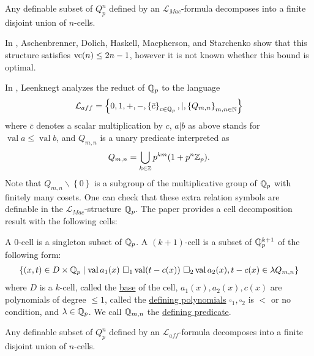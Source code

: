 \documentclass{amsart}
\renewcommand{\LL}{\mathcal L}
\newcommand{\LLM}{\mathcal L_{Mac}}
\newcommand{\curly}[1]{\left\{#1\right\}}
\DeclareMathOperator{\vval}{val}
\newcommand{\defn}{\underline}
\begin{document}
\begin{Theorem} [Denef '84]
  Any definable subset of $Q_p^n$ defined by an $\LLM$-formula decomposes into a finite disjoint union of $n$-cells.
\end{Theorem}  

In \cite{density}, Aschenbrenner, Dolich, Haskell, Macpherson, and Starchenko show that this structure satisfies $\operatorname{vc}(n) \leq 2n - 1$,
however it is not known whether this bound is optimal.

In \cite{reduct}, Leenknegt analyzes the reduct of $\mathbb{Q}_p$ to the language
\begin{align*}
  \LL_{aff}  = \curly{0, 1, +, -, \curly{\bar c}_{c \in \Q_p}, |, \curly{Q_{m,n}}_{m,n\in \N}}
\end{align*}
where $\bar c$ denotes a scalar multiplication by $c$,
$a | b$ as above stands for $\vval a \leq \vval b$,
and $Q_{m,n}$ is a unary predicate interpreted as
\begin{align*}
  Q_{m,n} = \bigcup_{k \in \mathbb{Z}} p^{km} (1 + p^n\mathbb{Z}_p).
\end{align*}
Note that $Q_{m,n} \backslash \curly{0}$ is a subgroup of the multiplicative group of $\mathbb{Q}_p$ with finitely many cosets.
One can check that these extra relation symbols are definable in the $\LLM$-structure $\mathbb{Q}_p$.
The paper \cite{reduct} provides a cell decomposition result with the following cells:

\begin{Definition} \label{cell}
  A $0$-cell is a singleton subset of $\mathbb{Q}_p$.
  A $(k+1)$-cell is a subset of $\mathbb{Q}_p^{k+1}$ of the following form:
  \begin{align*}
    \curly{(x, t) \in D \times \Q_p \mid \vval a_1(x) \ \square_1 \vval (t - c(x)) \ \square_2 \vval a_2(x), t - c(x) \in \lambda Q_{m,n} }
  \end{align*}
  where $D$ is a $k$-cell, called the \defn{base} of the cell,
  $a_1(x), a_2(x), c(x)$ are polynomials of degree $\leq 1$, called the \defn{defining polynomials}
  $\square_1, \square_2$ is $<$ or no condition, and
  $\lambda  \in\mathbb{Q}_p$.
  We call $\mathbb{Q}_{m,n}$ the \defn{defining predicate}.
\end{Definition}

\begin{Theorem}[Leenknegt '12] 
  Any definable subset of $Q_p^n$ defined by an $\LL_{aff}$-formula decomposes into a finite disjoint union of $n$-cells.
\end{Theorem}  
\end{document}
